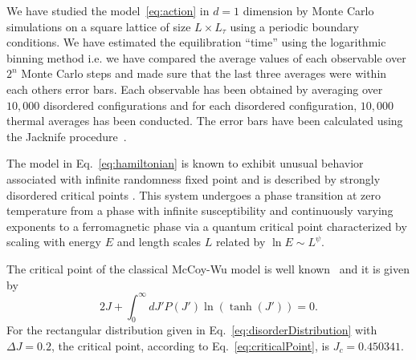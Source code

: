 \documentclass[aps,prl,twocolumn,10pt,notitlepage]{revtex4-1}
\begin{document}
We have studied the model~\eqref{eq:action} in $d = 1$ dimension by Monte Carlo simulations on a square lattice of size $L \times L_\tau$ using a periodic boundary conditions. We have estimated the equilibration ``time'' using the logarithmic binning method i.e. we have compared the average values of each observable over $2^n$ Monte Carlo steps and made sure that the last three averages were within each others error bars. Each observable has been obtained by averaging over $10,000$ disordered configurations and for each disordered configuration, $10,000$ thermal averages has been conducted. The error bars have been calculated using the Jacknife procedure~\cite{wuAOS1986,young2015everything,youngARX2012}.

The model in Eq.~\eqref{eq:hamiltonian} is known to exhibit unusual behavior associated with infinite randomness fixed point and is described by strongly disordered critical points \cite{fisherPRB1994,fisherPRB1995}. This system undergoes a phase transition at zero temperature from a phase with infinite susceptibility and continuously varying exponents to a ferromagnetic phase via a quantum critical point characterized by scaling with energy $E$ and length scales $L$ related by $\ln E \sim L^\psi$. 

The critical point of the classical McCoy-Wu model is well known~\cite{mccoyPR1968I,mccoyPR1969II,mccoyPR1969III} and it is given by
\begin{equation}\label{eq:criticalPoint}
	2J + \int_0^\infty dJ' P(J') \ln(\tanh(J')) = 0.
\end{equation}
For the rectangular distribution given in Eq.~\ref{eq:disorderDistribution} with $\Delta J = 0.2$, the critical point, according to Eq.~\eqref{eq:criticalPoint}, is $J_c = 0.450341$. 
\end{document}
